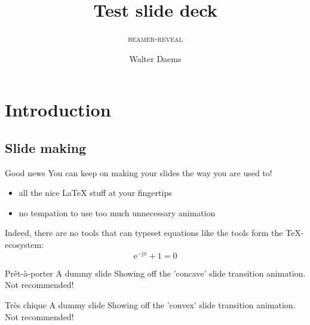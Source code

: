\documentclass[11pt,aspectratio=1610,t]{beamer}%
\title{Test slide deck}
\subtitle{\textsc{beamer-reveal}}
\author{Walter Daems}
\newcommand\eu{\mathrm{e}}
\newcommand\ju{\mathrm{j}}
\begin{document}
\begin{frame}[titleslide]
  \titlepage
\end{frame}


\section{Introduction}
\subsection{Slide making}

\begin{frame}
  {Good news}
  {}
  You can keep on making your slides the way you are used to!
  \begin{itemize}
  \item all the nice \LaTeX{} stuff at your fingertips
  \item no tempation to use too much unnecessary animation
  \end{itemize}
  \bigskip

  Indeed, there are no tools that can typeset equations like the tools form the \TeX-ecosystem:
  \begin{equation}
    \eu^{-\ju\pi}+1=0
  \end{equation}

\end{frame}


\begin{frame}[transition=concave,embed,autoslide=2000]
  {Pr\^et-\`a-porter}
  {A dummy slide}
  \vfill
  Showing off the 'concave' slide transition animation. Not recommended!
  \vfill
\end{frame}

\begin{frame}[transition=convex]
  {Très chique}
  {A dummy slide}
  \vfill
  Showing off the 'convex' slide transition animation. Not recommended!
  \vfill
\end{frame}
\end{document}
